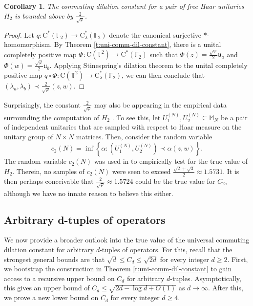 \documentclass[10pt]{amsart}
\newcommand{\bF}{{\mathbb{F}}}
\newcommand{\bM}{{\mathbb{M}}}
\newcommand{\bT}{{\mathbb{T}}}
\newcommand{\rC}{\mathrm{C}}
\renewcommand{\phi}{\varphi}
\newtheorem{corollary}[theorem]{Corollary}
\begin{document}
\begin{corollary}\label{c:haar-comm-dil-constant}
    The commuting dilation constant for a pair of free Haar unitaries $H_2$ is bounded above by $\frac{2}{\sqrt{\phi}}$.
\end{corollary}

\begin{proof}
    Let $q:\rC^*(\bF_2)\rightarrow \rC^*_\lambda(\bF_2)$ denote the canonical surjective $*$-homomorphism. By Theorem \ref{t:uni-comm-dil-constant}, there is a unital completely positive map $\Phi:\rC(\bT^2)\rightarrow\rC^*(\bF_2)$ such that $\Phi(z) = \frac{\sqrt{\phi}}{2}\mathfrak{u}_a$ and $\Phi(w) = \frac{\sqrt{\phi}}{2}\mathfrak{u}_b$. Applying Stinespring's dilation theorem to the unital completely positive map $q\circ\Phi:\rC(\bT^2)\rightarrow\rC^*_\lambda(\bF_2)$, we can then conclude that $(\lambda_a,\lambda_b)\prec \frac{2}{\sqrt{\phi}}(z,w)$.
\end{proof}


Surprisingly, the constant $\frac{2}{\sqrt{\phi}}$ may also be appearing in the empirical data surrounding the computation of $H_2$ \cite[Section 4]{gerhold2025empirical}. To see this, let $U_1^{(N)}, U_2^{(N)}\subseteq\bM_N$ be a pair of independent unitaries that are sampled with respect to Haar measure on the unitary group of $N\times N$ matrices. Then, consider the random variable
\[
    c_2(N) =\inf\left\{ \alpha : (U_1^{(N)},U_2^{(N)})\prec\alpha(z,w)\right\}.
\]
The random variable $c_2(N)$ was used in \cite[Section 4]{gerhold2025empirical} to empirically test for the true value of $H_2$. Therein, no samples of $c_2(N)$ were seen to exceed $\frac{\sqrt{2}+\sqrt{3}}{2}\approx1.5731$. It is then perhaps conceivable that $\frac{2}{\sqrt{\phi}}\approx 1.5724$ could be the true value for $C_2$, although we have no innate reason to believe this either.


\subsection{Arbitrary d-tuples of operators}\label{ss:d-tuples}

We now provide a broader outlook into the true value of the universal commuting dilation constant for arbitrary $d$-tuples of operators. For this, recall that the strongest general bounds are that $\sqrt{d}\leq C_d \leq\sqrt{2d}$ for every integer $d\geq 2$. First, we bootstrap the construction in Theorem \ref{t:uni-comm-dil-constant} to gain access to a recursive upper bound on $C_d$ for arbitrary $d$-tuples. Asymptotically, this gives an upper bound of $C_d\leq \sqrt{2d-\log d+O(1)}$ as $d\rightarrow\infty$. After this, we prove a new lower bound on $C_d$ for every integer $d\geq4$.
\end{document}
